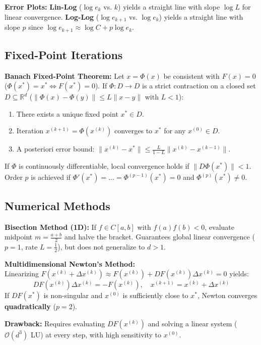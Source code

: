 \begin{remark}
    \textbf{Error Plots:}
    \textbf{Lin-Log} ($\log e_k$ vs. $k$) yields a straight line with slope $\log L$ for linear convergence.
    \textbf{Log-Log} ($\log e_{k+1}$ vs. $\log e_k$) yields a straight line with slope $p$ since $\log e_{k+1} \approx \log C + p \log e_k$.
\end{remark}

\subsection{Fixed-Point Iterations}

\begin{theorem}
    \textbf{Banach Fixed-Point Theorem:} Let $x = \Phi(x)$ be consistent with $F(x) = 0$ ($\Phi(x^*) = x^* \iff F(x^*) = 0$). If $\Phi: D \to D$ is a strict contraction on a closed set $D \subseteq \mathbb{R}^d$ ($\|\Phi(x) - \Phi(y)\| \le L \|x - y\|$ with $L < 1$):
    \begin{enumerate}
        \item There exists a unique fixed point $x^* \in D$.
        \item Iteration $x^{(k+1)} = \Phi(x^{(k)})$ converges to $x^*$ for any $x^{(0)} \in D$.
        \item A posteriori error bound: $\|x^{(k)} - x^*\| \le \frac{L}{1-L} \|x^{(k)} - x^{(k-1)}\|$.
    \end{enumerate}
    If $\Phi$ is continuously differentiable, local convergence holds if $\|D\Phi(x^*)\| < 1$. Order $p$ is achieved if $\Phi'(x^*) = \dots = \Phi^{(p-1)}(x^*) = 0$ and $\Phi^{(p)}(x^*) \neq 0$.
\end{theorem}

\subsection{Numerical Methods}

\begin{definition}
    \textbf{Bisection Method (1D):} If $f \in C[a, b]$ with $f(a)f(b) < 0$, evaluate midpoint $m = \frac{a+b}{2}$ and halve the bracket. Guarantees global linear convergence ($p = 1$, rate $L = \frac{1}{2}$), but does not generalize to $d > 1$.
\end{definition}

\begin{theorem}
    \textbf{Multidimensional Newton's Method:} \\
    Linearizing $F(x^{(k)} + \Delta x^{(k)}) \approx F(x^{(k)}) + DF(x^{(k)})\Delta x^{(k)} = 0$ yields:
    $$
        DF(x^{(k)}) \Delta x^{(k)} = -F(x^{(k)}), \quad x^{(k+1)} = x^{(k)} + \Delta x^{(k)}
    $$
    If $DF(x^*)$ is non-singular and $x^{(0)}$ is sufficiently close to $x^*$, Newton converges \textbf{quadratically} ($p = 2$).
    
    \textbf{Drawback:} Requires evaluating $DF(x^{(k)})$ and solving a linear system ($\mathcal{O}(d^3)$ LU) at every step, with high sensitivity to $x^{(0)}$.
\end{theorem}

